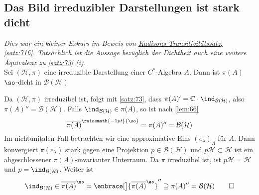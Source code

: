 \subsection{Das Bild irreduzibler Darstellungen ist stark dicht} %
\label{sub:das_bild_irreduzibler_darstellungen}
\emph{Dies war ein kleiner Exkurs im Beweis von \hyperref[satz:716]{Kadisons Transitivitätssatz, \ref*{satz:716}}. 
Tatsächlich ist die Aussage bezüglich der Dichtheit auch eine weitere Äquivalenz zu \autoref{satz:73} (i).}\smallskip \\
Sei $(\mathcal{H},\pi)$ eine irreduzible Darstellung einer $C^*$-Algebra $A$.
Dann ist $\pi(A)$ $\so$-dicht in $\mathcal{B}(\mathcal{H})$
\emph{}
\begin{beweis}
	Da $(\mathcal{H},\pi)$ irreduzibel ist, folgt mit \autoref{satz:73}, dass $\pi(A)'= \mathbb{C} \cdot \ind_{\mathcal{B}(\mathcal{H})}$, also $\pi(A)''=\mathcal{B}(\mathcal{H})$.
	Falls $\ind_{\mathcal{B}(\mathcal{H})} \in \pi(A)$, so ist nach \autoref{lem:66}
	\[
		\overline{\pi(A)}^{\raisemath{-1pt}{\so}}= \pi(A)''=\mathcal{B}(\mathcal{H})
	\]
	Im nichtunitalen Fall betrachten wir eine approximative Eins $(e_\lambda)_\Lambda$ für $A$.
	Dann konvergiert $\pi(e_\lambda)$ stark gegen eine Projektion $p \in \mathcal{B}(\mathcal{H})$ und $p \mathcal{H} \subset \mathcal{H}$ ist ein abgeschlossener $\pi(A)$-invarianter Unterraum.
	Da $\pi$ irreduzibel ist, ist $p \mathcal{H}=\mathcal{H}$ und $p=\ind_{\mathcal{B}(\mathcal{H})}$.
	Weiter ist 
	\[
		\ind_{\mathcal{B}(\mathcal{H})} \in  \overline{\pi(A)}^\so = \enbrace[\big]{\overline{\pi(A)}^\so}'' \supseteq \pi(A)'' = \mathcal{B}(\mathcal{H}) \qedhere
	\]
\end{beweis}

\printindex
\printbibliography
\listoffigures
